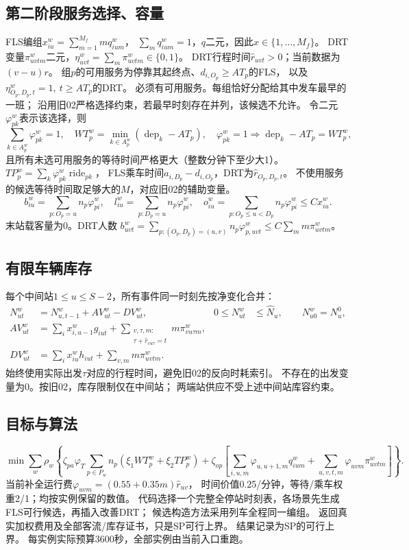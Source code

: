 \documentclass{ctexart}
\begin{document}
\subsection*{第二阶段服务选择、容量}
FLS编组$x_{iu}^w=\sum_{m=1}^{M_f}m q_{ium}^w$，
$\sum_mq_{ium}^w=1$，$q$二元，因此$x\in\{1,\ldots,M_f\}$。
DRT变量$\pi_{uvtm}^w$二元，$\eta_{uvt}^w=\sum_m\pi_{uvtm}^w\in\{0,1\}$。
DRT行程时间$\widehat r_{uvt}>0$；当前数据为$(v-u)r$。
组$p$的可用服务为停靠其起终点、$d_{i,O_p}\ge AT_p$的FLS，
以及$\eta_{O_p,D_p,t}^w=1,\ t\ge AT_p$的DRT。
必须有可用服务。每组恰好分配给其中发车最早的一班；
沿用旧02严格选择约束，若最早时刻存在并列，该候选不允许。
令二元$\varphi_{pk}^w$表示该选择，则
\[
\sum_{k\in A_p^w}\varphi_{pk}^w=1,\quad
WT_p^w=\min_{k\in A_p^w}(\operatorname{dep}_k-AT_p),\quad
\varphi_{pk}^w=1\Longrightarrow
 \operatorname{dep}_k-AT_p=WT_p^w,
\]
且所有未选可用服务的等待时间严格更大（整数分钟下至少大1）。
$TP_p^w=\sum_k\varphi_{pk}^w\operatorname{ride}_{pk}$，
FLS乘车时间$a_{i,D_p}-d_{i,O_p}$，DRT为$\widehat r_{O_p,D_p,t}$。
不使用服务的候选等待时间取足够大的$M$，对应旧02的辅助变量。
\[
 b^w_{iu}=\sum_{p:O_p=u}n_p\varphi_{pi}^w,\quad
 l^w_{iu}=\sum_{p:D_p=u}n_p\varphi_{pi}^w,\quad
 o^w_{iu}=\sum_{p:O_p\le u<D_p}n_p\varphi_{pi}^w
 \le Cx^w_{iu}.
\]
末站载客量为0。DRT人数
$b^w_{uvt}=\sum_{p:(O_p,D_p)=(u,v)}n_p\varphi^w_{p,uvt}
\le C\sum_m m\pi^w_{uvtm}$。

\subsection*{有限车辆库存}
每个中间站$1\le u\le S-2$，所有事件同一时刻先按净变化合并：
\begin{align*}
 N^w_{ut}&=N^w_{u,t-1}+AV^w_{ut}-DV^w_{ut},&
 0\le N^w_{ut}&\le\widehat N_u,\qquad N^w_{u0}=N_u^0,\\
 AV^w_{ut}&=\sum_i x^w_{i,u-1}g_{iut}
 +\sum_{\substack{v,\tau,m:\\\tau+\widehat r_{vu\tau}=t}}m\pi^w_{vu\tau m},\\
 DV^w_{ut}&=\sum_i x^w_{iu}h_{iut}+\sum_{v,m}m\pi^w_{uvtm}.
\end{align*}
始终使用实际出发$\tau$对应的行程时间，避免旧02的反向时耗索引。
不存在的出发变量为0。按旧02，库存限制仅在中间站；
两端站供应不受上述中间站库容约束。

\subsection*{目标与算法}
\[
\min\sum_w\rho_w\left\{
\zeta_{pa}\varphi_T\sum_{p\in P_w}n_p(\xi_1WT_p^w+\xi_2TP_p^w)
+\zeta_{op}\left[\sum_{i,u,m}\varphi_{u,u+1,m}q^w_{ium}
+\sum_{u,v,t,m}\varphi_{uvm}\pi^w_{uvtm}\right]\right\}.
\]
当前补全运行费$\varphi_{uvm}=(0.55+0.35m)\widehat r_{uv}$，
时间价值0.25/分钟，等待/乘车权重2/1；均按实例保留的数值。
代码选择一个完整全停站时刻表，各场景先生成FLS可行候选，再插入改善DRT；
候选构造方法采用列车全程同一编组。
返回真实加权费用及全部客流/库存证书，只是SP可行上界。
结果记录为SP的可行上界。
每实例实际预算3600秒，全部实例由当前入口重跑。
\end{document}
